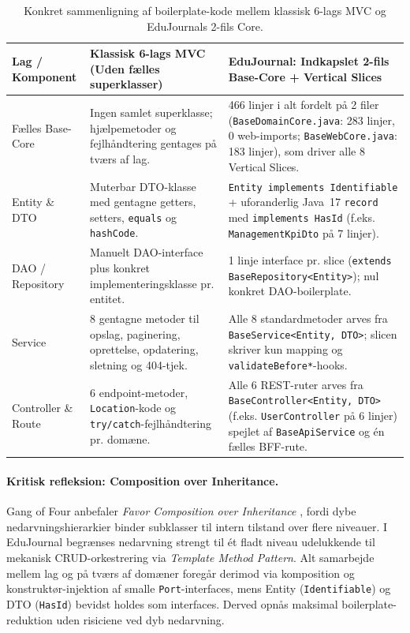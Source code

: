 \documentclass[11pt,a4paper]{article}
\begin{document}
\begin{table}[htbp]
\begin{table}[htbp]
\centering
\small
\begin{tabularx}{\textwidth}{P{3.0cm} P{4.8cm} Y}
\toprule
\textbf{Lag / Komponent} & \textbf{Klassisk 6-lags MVC (Uden fælles superklasser)} & \textbf{EduJournal: Indkapslet 2-fils Base-Core + Vertical Slices} \\
\midrule
Fælles Base-Core & Ingen samlet superklasse; hjælpemetoder og fejlhåndtering gentages på tværs af lag. & 466 linjer i alt fordelt på 2 filer (\texttt{BaseDomainCore.java}: 283 linjer, 0 web-imports; \texttt{BaseWebCore.java}: 183 linjer), som driver alle 8 Vertical Slices. \\
Entity \& DTO & Muterbar DTO-klasse med gentagne getters, setters, \texttt{equals} og \texttt{hashCode}. & \texttt{Entity implements Identifiable} + uforanderlig Java~17 \texttt{record} med \texttt{implements HasId} (f.eks. \texttt{ManagementKpiDto} på 7 linjer). \\
DAO / Repository & Manuelt DAO-interface plus konkret implementeringsklasse pr. entitet. & 1 linje interface pr. slice (\texttt{extends BaseRepository<Entity>}); nul konkret DAO-boilerplate. \\
Service & 8 gentagne metoder til opslag, paginering, oprettelse, opdatering, sletning og 404-tjek. & Alle 8 standardmetoder arves fra \texttt{BaseService<Entity, DTO>}; slicen skriver kun mapping og \texttt{validateBefore*}-hooks. \\
Controller \& Route & 6 endpoint-metoder, \texttt{Location}-kode og \texttt{try/catch}-fejlhåndtering pr. domæne. & Alle 6 REST-ruter arves fra \texttt{BaseController<Entity, DTO>} (f.eks. \texttt{UserController} på 6 linjer) spejlet af \texttt{BaseApiService} og én fælles BFF-rute. \\
\bottomrule
\end{tabularx}
\caption{Konkret sammenligning af boilerplate-kode mellem klassisk 6-lags MVC og EduJournals 2-fils Core.}
\label{tab:boilerplate_comparison}
\end{table}

\paragraph{Kritisk refleksion: Composition over Inheritance.} Gang of Four anbefaler \textit{Favor Composition over Inheritance} \cite{gamma1994}, fordi dybe nedarvningshierarkier binder subklasser til intern tilstand over flere niveauer. I EduJournal begrænses nedarvning strengt til ét fladt niveau udelukkende til mekanisk CRUD-orkestrering via \textit{Template Method Pattern}. Alt samarbejde mellem lag og på tværs af domæner foregår derimod via komposition og konstruktør-injektion af smalle \texttt{Port}-interfaces, mens Entity (\texttt{Identifiable}) og DTO (\texttt{HasId}) bevidst holdes som interfaces. Derved opnås maksimal boilerplate-reduktion uden risiciene ved dyb nedarvning.


\end{table}
\end{document}
